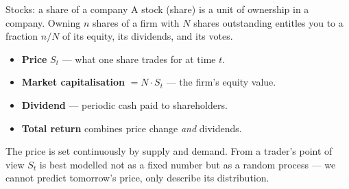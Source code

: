 \documentclass[11pt,aspectratio=169]{beamer}
\newcommand{\und}{S}                         %
\begin{document}
\begin{frame}{Stocks: a share of a company}
  A \alert{stock} (share) is a unit of ownership in a company. Owning
  $n$ shares of a firm with $N$ shares outstanding entitles you to a
  fraction $n/N$ of its equity, its dividends, and its votes.
  \vspace{0.5em}
  \begin{itemize}
    \item \textbf{Price} $\und_t$ — what one share trades for at time $t$.
    \item \textbf{Market capitalisation} $= N \cdot \und_t$ — the firm's equity value.
    \item \textbf{Dividend} — periodic cash paid to shareholders.
    \item \textbf{Total return} combines price change \emph{and} dividends.
  \end{itemize}
  \vspace{0.4em}
  The price is set continuously by supply and demand. From a trader's
  point of view $\und_t$ is best modelled not as a fixed number but as a
  \alert{random process} — we cannot predict tomorrow's price, only
  describe its distribution.
\end{frame}
\end{document}
